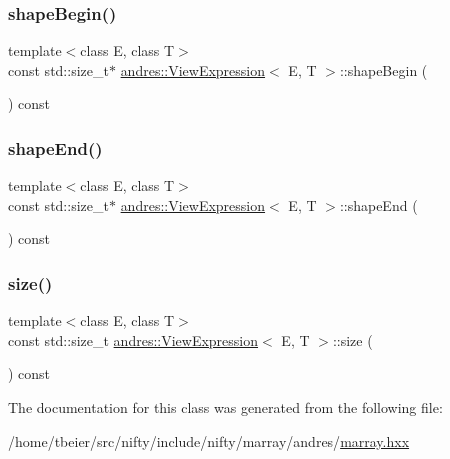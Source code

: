 \mbox{\label{classandres_1_1ViewExpression_aeeb7dd43b8dbbd5b16e9e79f9de5b31a}} 
\subsubsection{\texorpdfstring{shape\+Begin()}{shapeBegin()}}
{\footnotesize\ttfamily template$<$class E, class T$>$ \\
const std\+::size\+\_\+t$\ast$ \hyperlink{classandres_1_1ViewExpression}{andres\+::\+View\+Expression}$<$ E, T $>$\+::shape\+Begin (\begin{DoxyParamCaption}{ }\end{DoxyParamCaption}) const\hspace{0.3cm}{\ttfamily [inline]}}

\mbox{\label{classandres_1_1ViewExpression_aa379edb9a9c633b93391f5f696954a3a}} 
\subsubsection{\texorpdfstring{shape\+End()}{shapeEnd()}}
{\footnotesize\ttfamily template$<$class E, class T$>$ \\
const std\+::size\+\_\+t$\ast$ \hyperlink{classandres_1_1ViewExpression}{andres\+::\+View\+Expression}$<$ E, T $>$\+::shape\+End (\begin{DoxyParamCaption}{ }\end{DoxyParamCaption}) const\hspace{0.3cm}{\ttfamily [inline]}}

\mbox{\label{classandres_1_1ViewExpression_aec0e6310accbc6774bc40e1e2c2a2c1b}} 
\subsubsection{\texorpdfstring{size()}{size()}}
{\footnotesize\ttfamily template$<$class E, class T$>$ \\
const std\+::size\+\_\+t \hyperlink{classandres_1_1ViewExpression}{andres\+::\+View\+Expression}$<$ E, T $>$\+::size (\begin{DoxyParamCaption}{ }\end{DoxyParamCaption}) const\hspace{0.3cm}{\ttfamily [inline]}}



The documentation for this class was generated from the following file\+:\begin{DoxyCompactItemize}
\item 
/home/tbeier/src/nifty/include/nifty/marray/andres/\hyperlink{andres_2marray_8hxx}{marray.\+hxx}\end{DoxyCompactItemize}
